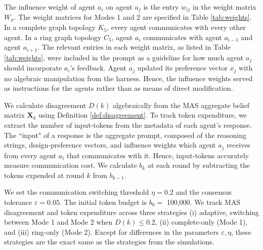 \documentclass[journal,twoside,web]{ieeecolor_no_firstpage_logo}
\begin{document}
The influence weight of agent $a_i$ on agent $a_j$ is the entry $w_{ij}$ in the weight matrix $W_\sigma$. The weight matrices for Modes 1 and 2 are specified in Table \ref{tab:weights}. In a complete graph topology $K_5$, every agent communicates with every other agent. In a ring graph topology $C_5$, agent $a_i$ communicates with agent $a_{i-1}$ and agent $a_{i+1}.$ The relevant entries in each weight matrix, as listed in Table \ref{tab:weights}, were included in the prompt as a guideline for how much agent $a_j$ should incorporate $a_i$'s feedback. Agent $a_j$ updated its preference vector $x_j$ with no algebraic manipulation from the harness. Hence, the influence weights served as instructions for the agents rather than as means of direct modification.

We calculate disagreement $D(k)$ algebraically from the MAS aggregate belief matrix $\mathbf{X}_k$ using Definition \ref{def:disagreement}. To track token expenditure, we extract the number of input-tokens from the metadata of each agent's response. The ``input" of a response is the aggregate prompt, composed of the reasoning strings, design-preference vectors, and influence weights which agent $a_j$ receives from every agent $a_i$ that communicates with it. Hence, input-tokens accurately measure communication cost. We calculate $b_k$ at each round by subtracting the tokens expended at round $k$ from $b_{k-1}.$ 

We set the communication switching threshold $\eta = 0.2$ and the consensus tolerance $\varepsilon = 0.05.$ The initial token budget is $b_0 = $ 100,000. We track MAS disagreement and token expenditure across three strategies (i) adaptive, switching between Mode 1 and Mode 2 when $D(k) \leq 0.2$, (ii) complete-only (Mode 1), and (iii) ring-only (Mode 2). Except for differences in the parameters $\varepsilon, \eta$, these strategies are the exact same as the strategies from the simulations. 
\end{document}

